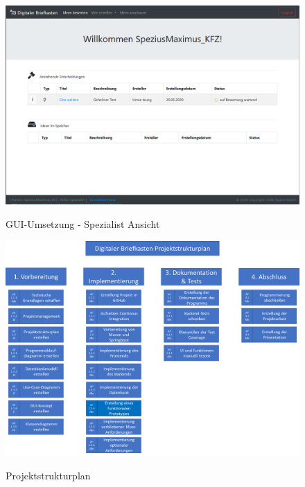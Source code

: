 \begin{figure}[h]
    \centering
    \begin{minipage}[t]{1\textwidth}
        \caption{GUI-Umsetzung - Spezialist Ansicht }
        \includegraphics[width=1\textwidth]{img/spezialist-umsetzung.png}\\
    \end{minipage}
\end{figure}

\pagebreak
\clearpage

\label{PSP}
\begin{figure}[h]
    \centering
    \begin{minipage}[t]{1\textwidth}
        \caption{Projektstrukturplan}
        \includegraphics[width=1\textwidth]{img/psp.png}\\
    \end{minipage}
\end{figure}

